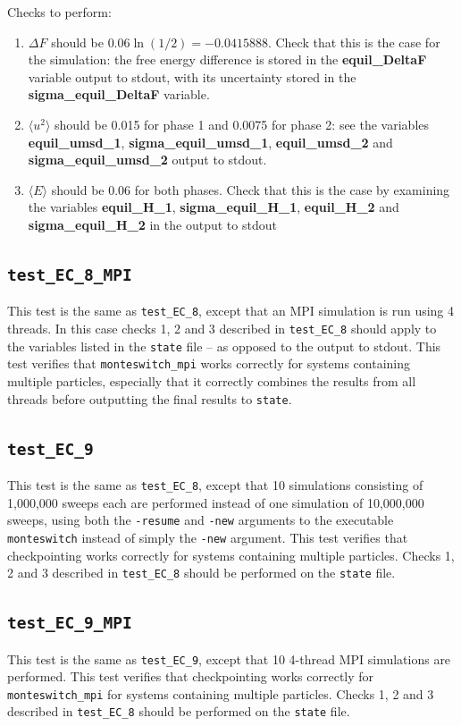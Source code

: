 \documentclass{report}
\begin{document}
Checks to perform:
\begin{enumerate}
\item
$\Delta F$ should be $0.06\ln(1/2)=-0.0415888$.
Check that this is the case for the simulation: the free energy difference is stored in the \textbf{equil\_DeltaF}
variable output to stdout, with its uncertainty stored in the \textbf{sigma\_equil\_DeltaF} variable. 
\item
$\langle u^2\rangle$ should be 0.015 for phase 1 and 0.0075 for phase 2: see the 
variables \textbf{equil\_umsd\_1}, \textbf{sigma\_equil\_umsd\_1}, \textbf{equil\_umsd\_2} and \textbf{sigma\_equil\_umsd\_2} output to
stdout.
\item
$\langle E\rangle$ should be 0.06 for both phases. Check that this
is the case by examining the variables \textbf{equil\_H\_1}, \textbf{sigma\_equil\_H\_1}, \textbf{equil\_H\_2} and \textbf{sigma\_equil\_H\_2}
in the output to stdout
\end{enumerate}


\subsection{\texttt{test\_EC\_8\_MPI}}
This test is the same as \texttt{test\_EC\_8}, except that an MPI simulation is run using 4 threads.  In this case checks
1, 2 and 3 described in \texttt{test\_EC\_8} should apply to the variables listed in the \texttt{state} file -- as opposed to the output to
stdout. This test verifies that \texttt{monteswitch\_mpi} works correctly for systems containing multiple particles, especially that it correctly
combines the results from all threads before outputting the final results to \texttt{state}.


\subsection{\texttt{test\_EC\_9}}
This test is the same as \texttt{test\_EC\_8}, except that 10 simulations consisting of 1,000,000 sweeps each are performed
instead of one simulation of 10,000,000 sweeps, using both the \texttt{-resume} and \texttt{-new} arguments to the executable 
\texttt{monteswitch} instead of simply the \texttt{-new} argument. This test verifies that checkpointing works
correctly for systems containing multiple particles. Checks 1, 2 and 3 described in \texttt{test\_EC\_8} should be performed on the \texttt{state} file.


\subsection{\texttt{test\_EC\_9\_MPI}}
This test is the same as \texttt{test\_EC\_9}, except that 10 4-thread MPI simulations are performed. This test verifies 
that checkpointing works correctly for \texttt{monteswitch\_mpi} for systems containing multiple particles. 
Checks 1, 2 and 3 described in \texttt{test\_EC\_8} should be performed on the \texttt{state} file.
\end{document}
